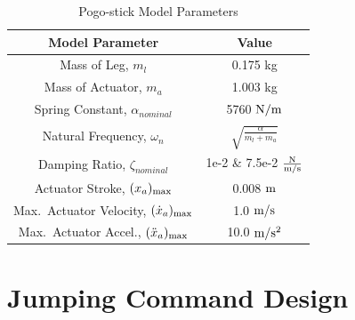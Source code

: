 \documentclass[letterpaper, 10 pt, conference]{ieeeconf}  %
\begin{document}
\begin{table}[t]
        \caption{Pogo-stick Model Parameters}
        \vspace{-4mm}
        \label{tab:pogoStickSystem}
        \begin{center}
                \begin{tabular}{|c||c|}
                \hline
                \textbf{Model Parameter} & \textbf{Value}\\
                \hline
                Mass of Leg, $m_l$                                       & 0.175 kg                                          \\
                Mass of Actuator, $m_a$                                  & 1.003 kg                                          \\
                Spring Constant, $\alpha_{nominal}$                      & 5760 $\textup{N}/\textup{m}$                      \\
                Natural Frequency, $\omega_n$                            & $\sqrt{\frac{\alpha}{m_l + m_a}}$                 \\
                Damping Ratio, $\zeta_{nominal}$                         & 1e-2 \& 7.5e-2 $\frac{\textup{N}}{\textup{m/s}}$  \\
                \hline
                Actuator Stroke, $(x_{a})_{\textup{max}}$                & 0.008 $\textup{m}$                                \\
                Max.\ Actuator Velocity, $(\dot{x}_{a})_{\textup{max}}$  & 1.0 $\textup{m}/\textup{s}$                       \\ 
                Max.\ Actuator Accel., $(\ddot{x}_{a})_{\textup{max}}$   & 10.0 $\textup{m}/\textup{s}^2$                    \\
                \hline
                \end{tabular}
        \end{center}
\end{table}
% 
        
\section{Jumping Command Design}
\label{sec:control_input_exp}
\end{document}
